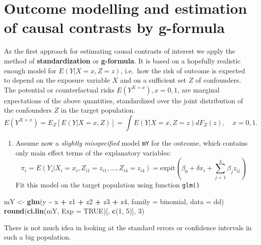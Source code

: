 \documentclass[
]{book}
\newenvironment{Shaded}{\begin{snugshade}}{\end{snugshade}}
\newcommand{\AttributeTok}[1]{\textcolor[rgb]{0.13,0.29,0.53}{#1}}
\newcommand{\ConstantTok}[1]{\textcolor[rgb]{0.56,0.35,0.01}{#1}}
\newcommand{\DecValTok}[1]{\textcolor[rgb]{0.00,0.00,0.81}{#1}}
\newcommand{\FunctionTok}[1]{\textcolor[rgb]{0.13,0.29,0.53}{\textbf{#1}}}
\newcommand{\NormalTok}[1]{#1}
\newcommand{\OtherTok}[1]{\textcolor[rgb]{0.56,0.35,0.01}{#1}}
\newcommand{\SpecialCharTok}[1]{\textcolor[rgb]{0.81,0.36,0.00}{\textbf{#1}}}
\providecommand{\tightlist}{%
  \setlength{\itemsep}{0pt}\setlength{\parskip}{0pt}}
\begin{document}
\section{Outcome modelling and estimation of causal contrasts by g-formula}\label{outcome-modelling-and-estimation-of-causal-contrasts-by-g-formula}

As the first approach for estimating causal contrasts of interest
we apply the method of \textbf{standardization} or \textbf{g-formula}.
It is based on a hopefully realistic enough model for
\(E(Y|X=x, Z=z)\), i.e.~how the risk
of outcome is expected to depend on the exposure variable
\(X\) and on a
sufficient set \(Z\) of confounders. The potential
or counterfactual risks
\(E(Y^{X=x}), x=0,1\), are marginal expectations of the above
quantities, standardized over the joint distribution of the confounders \(Z\) in the
target population.
\[ E(Y^{X=x}) = E_Z[E(Y|X=x,Z)]
       = \int E(Y|X=x, Z=z)dF_Z(z), \quad x=0,1. \]

\begin{enumerate}
\def\labelenumi{\arabic{enumi}.}
\tightlist
\item
  Assume now a \emph{slightly misspecified} model \texttt{mY}
  for the outcome, which contains only main effect terms
  of the explanatory variables:
  \[ \pi_i = E(Y_i|X_i=x_i, Z_{i1}=z_{i1}, \dots, Z_{i4}=z_{i4}) =
    \text{expit}\left(\beta_0 + \delta x_i +
    \sum_{j=1}^4 \beta_j z_{ij} \right) \]
  Fit this model on the
  target population using function \texttt{glm()}
\end{enumerate}

\begin{Shaded}
\begin{Highlighting}[]
\NormalTok{mY }\OtherTok{\textless{}{-}} \FunctionTok{glm}\NormalTok{(y }\SpecialCharTok{\textasciitilde{}}\NormalTok{ x }\SpecialCharTok{+}\NormalTok{ z1 }\SpecialCharTok{+}\NormalTok{ z2 }\SpecialCharTok{+}\NormalTok{ z3 }\SpecialCharTok{+}\NormalTok{ z4, }\AttributeTok{family =}\NormalTok{ binomial, }\AttributeTok{data =}\NormalTok{ dd)}
\FunctionTok{round}\NormalTok{(}\FunctionTok{ci.lin}\NormalTok{(mY, }\AttributeTok{Exp =} \ConstantTok{TRUE}\NormalTok{)[, }\FunctionTok{c}\NormalTok{(}\DecValTok{1}\NormalTok{, }\DecValTok{5}\NormalTok{)], }\DecValTok{3}\NormalTok{)}
\end{Highlighting}
\end{Shaded}

There is not much idea in looking at the standard errors or
confidence intervals in such a big population.
\end{document}
